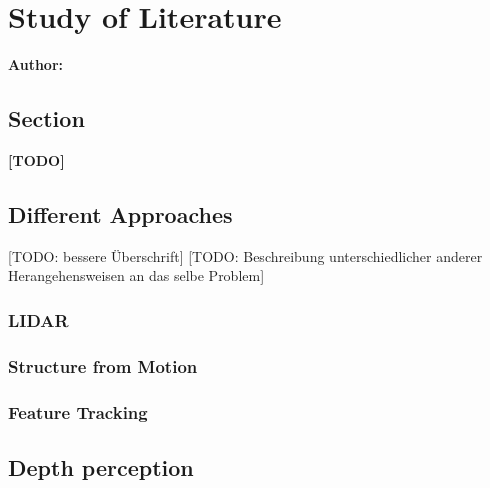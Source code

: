 \chapter{Study of Literature}

\textbf{Author: } 

\section{Section}
\textbf{[TODO]}
\newline
\lipsum[1]

\section{Different Approaches}
[TODO: bessere Überschrift]
[TODO: Beschreibung unterschiedlicher anderer Herangehensweisen an das selbe Problem]

\subsection{LIDAR}

\subsection{Structure from Motion}

\subsection{Feature Tracking}

\section{Depth perception}

\filbreak